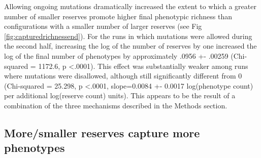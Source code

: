 \documentclass[letterpaper]{article}
\begin{document}
Allowing ongoing mutations dramatically increased the extent to which a greater number of smaller reserves promote higher final phenotypic richness than configurations with a smaller number of larger reserves (see Fig \ref{fig:capturedrichnessend}).  For the runs in which mutations were allowed during the second half, increasing the log of the number of reserves by one increased the log of the final number of phenotypes by approximately .0956 +- .00259 (Chi-squared = 1172.6, p \textless .0001). This effect was substantially weaker among runs where mutations were disallowed, although still significantly different from 0 (Chi-squared = 25.298, p \textless .0001, slope=0.0084 +- 0.0017 log(phenotype count) per additional log(reserve count) units). This appears to be the result of a combination of the three mechanisms described in the Methods section.
%
%
%
%
%
%
%
%


\subsection{More/smaller reserves capture more phenotypes}
\end{document}
